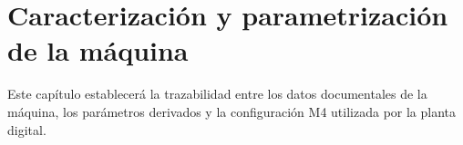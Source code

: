\section{Caracterización y parametrización de la máquina}

Este capítulo establecerá la trazabilidad entre los datos documentales de la máquina, los parámetros derivados y la configuración M4 utilizada por la planta digital.
